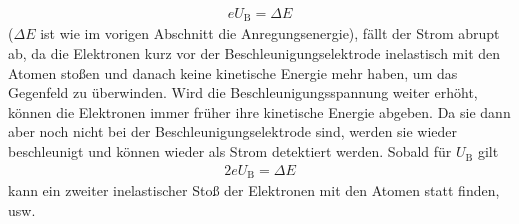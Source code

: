 \begin{align}
	eU_\text{B} = \Delta E
\end{align}
($\Delta E$ ist wie im vorigen Abschnitt die Anregungsenergie), fällt der Strom abrupt ab, da die Elektronen kurz vor der Beschleunigungselektrode inelastisch mit den Atomen stoßen und danach keine kinetische Energie mehr haben, um das Gegenfeld zu überwinden. Wird die Beschleunigungsspannung weiter erhöht, können die Elektronen immer früher ihre kinetische Energie abgeben. Da sie dann aber noch nicht bei der Beschleunigungselektrode sind, werden sie wieder beschleunigt und können wieder als Strom detektiert werden. Sobald für $U_\text{B}$ gilt
\begin{align}
	2eU_\text{B} = \Delta E
\end{align}
kann ein zweiter inelastischer Stoß der Elektronen mit den Atomen statt finden, usw.
